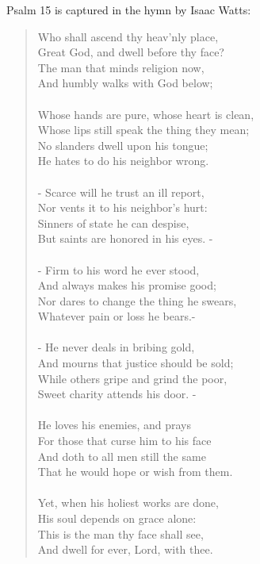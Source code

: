 \noindent Psalm 15 is captured in the hymn by Isaac Watts:
\begin{quote}
Who shall ascend thy heav'nly place,\\
Great God, and dwell before thy face?\\
The man that minds religion now,\\
And humbly walks with God below;\\
\\
Whose hands are pure, whose heart is clean,\\
Whose lips still speak the thing they mean;\\
No slanders dwell upon his tongue;\\
He hates to do his neighbor wrong.\\
\\
- Scarce will he trust an ill report,\\
Nor vents it to his neighbor's hurt:\\
Sinners of state he can despise,\\
But saints are honored in his eyes. -\\
\\
- Firm to his word he ever stood,\\
And always makes his promise good;\\
Nor dares to change the thing he swears,\\
Whatever pain or loss he bears.- \\
\\
- He never deals in bribing gold,\\
And mourns that justice should be sold;\\
While others gripe and grind the poor,\\
Sweet charity attends his door. -\\
\\
He loves his enemies, and prays\\
For those that curse him to his face\\
And doth to all men still the same\\
That he would hope or wish from them.\\
\\
Yet, when his holiest works are done,\\
His soul depends on grace alone:\\
This is the man thy face shall see,\\
And dwell for ever, Lord, with thee.   \\
\end{quote}